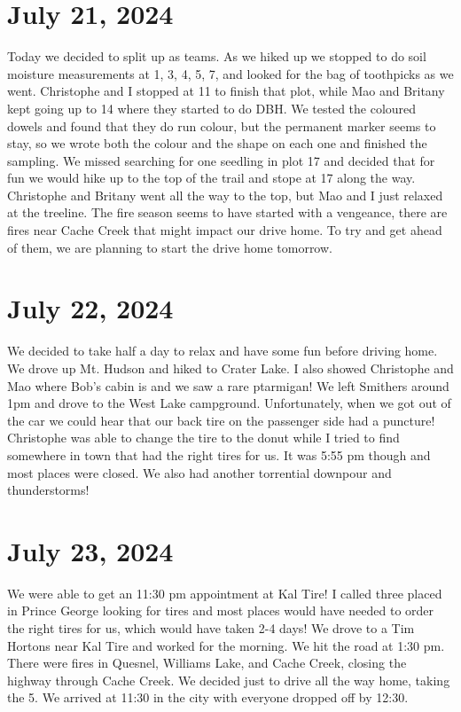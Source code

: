 \documentclass{article}\usepackage[]{graphicx}\usepackage[]{color}
\begin{document}
\section*{July 21, 2024}

Today we decided to split up as teams. As we hiked up we stopped to do soil moisture measurements at 1, 3, 4, 5, 7, and looked for the bag of toothpicks as we went. Christophe and I stopped at 11 to finish that plot, while Mao and Britany kept going up to 14 where they started to do DBH.  We tested the coloured dowels and found that they do run colour, but the permanent marker seems to stay, so we wrote both the colour and the shape on each one and finished the sampling. We missed searching for one seedling in plot 17 and decided that for fun we would hike up to the top of the trail and stope at 17 along the way. Christophe and Britany went all the way to the top, but Mao and I just relaxed at the treeline. The fire season seems to have started with a vengeance, there are fires near Cache Creek that might impact our drive home. To try and get ahead of them, we are planning to start the drive home tomorrow.

\section*{July 22, 2024}

We decided to take half a day to relax and have some fun before driving home. We drove up Mt. Hudson and hiked to Crater Lake. I also showed Christophe and Mao where Bob's cabin is and we saw a rare ptarmigan! We left Smithers around 1pm and drove to the West Lake campground. Unfortunately, when we got out of the car we could hear that our back tire on the passenger side had a puncture! Christophe was able to change the tire to the donut while I tried to find somewhere in town that had the right tires for us. It was 5:55 pm though and most places were closed. We also had another torrential downpour and thunderstorms!

\section*{July 23, 2024}

We were able to get an 11:30 pm appointment at Kal Tire! I called three placed in Prince George looking for tires and most places would have needed to order the right tires for us, which would have taken 2-4 days! We drove to a Tim Hortons near Kal Tire and worked for the morning. We hit the road at 1:30 pm. There were fires in Quesnel, Williams Lake, and Cache Creek, closing the highway through Cache Creek. We decided just to drive all the way home, taking the 5. We arrived at 11:30 in the city with everyone dropped off by 12:30. 
\end{document}
